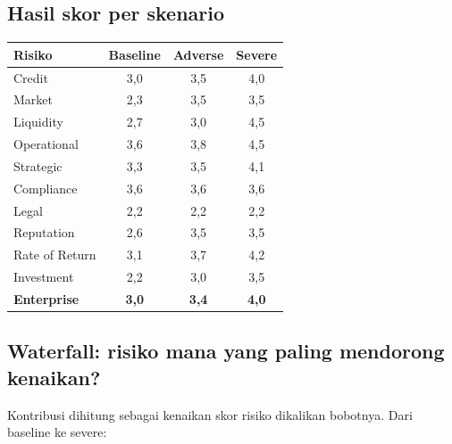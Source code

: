 \documentclass[11pt,a4paper]{article}
\begin{document}
\subsection{Hasil skor per skenario}

\begin{center}
\begin{tabular}{lccc}
\toprule
\textbf{Risiko} & \textbf{Baseline} & \textbf{Adverse} & \textbf{Severe}\\
\midrule
Credit & \cellcolor{tintamber}3{,}0 & \cellcolor{tintred}3{,}5 & \cellcolor{tintred}4{,}0\\
Market & \cellcolor{tintgreen}2{,}3 & \cellcolor{tintred}3{,}5 & \cellcolor{tintred}3{,}5\\
Liquidity & \cellcolor{tintamber}2{,}7 & \cellcolor{tintamber}3{,}0 & \cellcolor{tintred}4{,}5\\
Operational & \cellcolor{tintred}3{,}6 & \cellcolor{tintred}3{,}8 & \cellcolor{tintred}4{,}5\\
Strategic & \cellcolor{tintamber}3{,}3 & \cellcolor{tintred}3{,}5 & \cellcolor{tintred}4{,}1\\
Compliance & \cellcolor{tintred}3{,}6 & \cellcolor{tintred}3{,}6 & \cellcolor{tintred}3{,}6\\
Legal & \cellcolor{tintgreen}2{,}2 & \cellcolor{tintgreen}2{,}2 & \cellcolor{tintgreen}2{,}2\\
Reputation & \cellcolor{tintamber}2{,}6 & \cellcolor{tintred}3{,}5 & \cellcolor{tintred}3{,}5\\
Rate of Return & \cellcolor{tintamber}3{,}1 & \cellcolor{tintred}3{,}7 & \cellcolor{tintred}4{,}2\\
Investment & \cellcolor{tintgreen}2{,}2 & \cellcolor{tintamber}3{,}0 & \cellcolor{tintred}3{,}5\\
\midrule
\textbf{Enterprise} & \cellcolor{tintamber}\textbf{3{,}0} & \cellcolor{tintamber}\textbf{3{,}4} & \cellcolor{tintred}\textbf{4{,}0}\\
\bottomrule
\end{tabular}
\end{center}

\subsection{Waterfall: risiko mana yang paling mendorong kenaikan?}

Kontribusi dihitung sebagai kenaikan skor risiko dikalikan bobotnya. Dari baseline ke severe:
\end{document}
